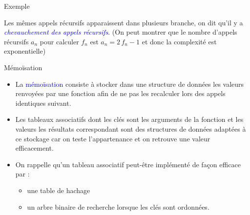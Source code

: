 \documentclass[10pt]{beamer}
\begin{document}
\begin{frame}{\Ctitle}{\stitle}
	\begin{exampleblock}{Exemple}
		\begin{center}
		\end{center}
		 Les mêmes appels récursifs apparaissent dans plusieurs branche, on dit qu'il y a \textcolor{blue}{\textit{chevauchement des appels récursifs}}.
		\onslide<3-> (On peut montrer que le nombre d'appels récursifs $a_n$ pour calculer $f_n$ est $a_n = 2\,f_n -1$ et donc la complexité est exponentielle)
	\end{exampleblock}
\end{frame}



\begin{frame}{\Ctitle}{\stitle}
	\begin{alertblock}{Mémoïsation}
		\begin{itemize}
			\item<1-> La \textcolor{blue}{mémoïsation} consiste à stocker dans une structure de données les valeurs renvoyées par une fonction afin de ne pas les recalculer lors des appels identiques suivant.\\
			\item<2-> Les tableaux associatifs dont les clés sont les arguments de la fonction et les valeurs les résultats correspondant sont des structures de données adaptées à ce stockage car on teste l'appartenance et on retrouve une valeur efficacement.
			\item<3-> On rappelle qu'un tableau associatif peut-être implémenté de façon efficace par :
			\begin{itemize}
				\item une table de hachage 
				\item un arbre binaire de recherche lorsque les clés sont ordonnées.
			\end{itemize}
		\end{itemize}
	\end{alertblock}
\end{frame}
\end{document}
